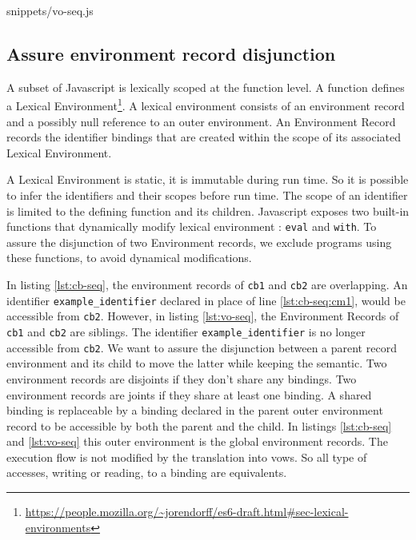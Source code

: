              {snippets/vo-seq.js}

\subsection{Assure environment record disjunction} \label{section:disjunction}

A subset of Javascript is lexically scoped at the function level.
A function defines a Lexical Environment\footnote{\url{https://people.mozilla.org/~jorendorff/es6-draft.html\#sec-lexical-environments}}.
A lexical environment consists of an environment record and a possibly null reference to an outer environment.
An Environment Record records the identifier bindings that are created within the scope of its associated Lexical Environment.

A Lexical Environment is static, it is immutable during run time.
So it is possible to infer the identifiers and their scopes before run time.
The scope of an identifier is limited to the defining function and its children.
Javascript exposes two built-in functions that dynamically modify lexical environment : \texttt{eval} and \texttt{with}.
To assure the disjunction of two Environment records, we exclude programs using these functions, to avoid dynamical modifications.

In listing \ref{lst:cb-seq}, the environment records of \texttt{cb1} and \texttt{cb2} are overlapping.
An identifier \texttt{example_identifier} declared in place of  line \ref{lst:cb-seq:cm1}, would be accessible from \texttt{cb2}.
However, in listing \ref{lst:vo-seq}, the Environment Records of \texttt{cb1} and \texttt{cb2} are siblings.
The identifier \texttt{example_identifier} is no longer accessible from \texttt{cb2}.
We want to assure the disjunction between a parent record environment and its child to move the latter while keeping the semantic.
Two environment records are disjoints if they don't share any bindings.
Two environment records are joints if they share at least one binding.
A shared binding is replaceable by a binding declared in the parent outer environment record to be accessible by both the parent and the child.
In listings \ref{lst:cb-seq} and \ref{lst:vo-seq} this outer environment is the global environment records.
The execution flow is not modified by the translation into vows.
So all type of accesses, writing or reading, to a binding are equivalents.



